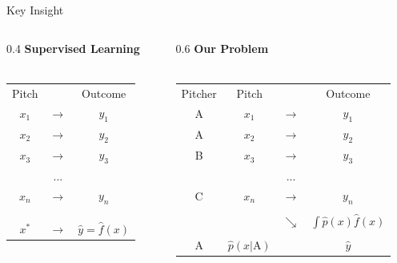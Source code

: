 \documentclass{beamer}
\begin{document}
  \begin{frame}{Key Insight}
    \begin{columns}
      \begin{column}{0.4\columnwidth}
        \centering
        {\bf Supervised Learning}\\
        ~\\
        \begin{tabular}{ccc}
          Pitch &               & Outcome\\
          $x_1$ & $\rightarrow$ & $y_1$\\
          $x_2$ & $\rightarrow$ & $y_2$\\
          $x_3$ & $\rightarrow$ & $y_3$\\
                & ...           &      \\
          $x_n$ & $\rightarrow$ & $y_n$\\
          \\
          \\
          \\
          $x^*$ & $\rightarrow$ & $\hat y = \hat f(x)$\\
        \end{tabular}
      \end{column}
      \begin{column}{0.6\columnwidth}
        \centering
        {\bf Our Problem}\\
        ~\\
        \begin{tabular}{cccc}
          Pitcher & Pitch &               & Outcome\\
          A       & $x_1$ & $\rightarrow$ & $y_1$\\
          A       & $x_2$ & $\rightarrow$ & $y_2$\\
          B       & $x_3$ & $\rightarrow$ & $y_3$\\
                  &       & ...           &      \\
          C       & $x_n$ & $\rightarrow$ & $y_n$\\
                  & \\
                  &       & $\searrow$    & {\color{solarizedRebase03} $\int\hat p(x)\hat f(x)$}\\
                  & \\
          A       &  {\color{solarizedRebase03} $\hat p(x|\text{A})$}     &               & $\hat y$\\
        \end{tabular}
      \end{column}
    \end{columns}
  \end{frame}
\end{document}
